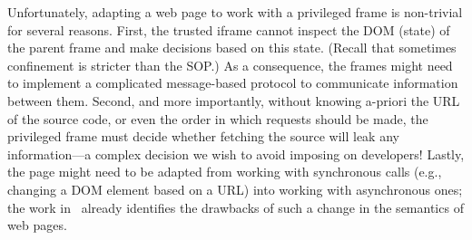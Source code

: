 Unfortunately, adapting a web page to work with a privileged frame 
is non-trivial for several reasons.
%
First, the trusted iframe cannot inspect the DOM (state) of the parent frame
and make decisions based on this state. 
%
(Recall that sometimes confinement is stricter than the SOP.)
%
As a consequence, the frames might need to implement a complicated
message-based protocol to communicate information between them.
%
Second, and more importantly, without knowing a-priori
the URL of the source code, or even the order in which requests should
be made, the privileged frame must decide whether fetching the source
will leak any information---a complex decision we wish to avoid
imposing on developers!  Lastly, the page might need to be adapted
from working with synchronous calls (e.g., changing a DOM element
based on a URL) into working with asynchronous ones; the work
in~\cite{Ingram:2012} already identifies the drawbacks of such a
change in the semantics of web pages.


%
%
%
%



